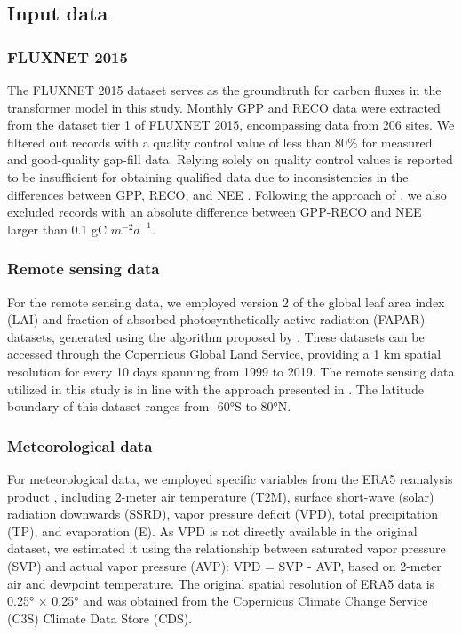 \subsection{Input data}

\subsubsection*{FLUXNET 2015}
The FLUXNET 2015 dataset \citep{pastorello2020fluxnet2015} serves as the groundtruth for carbon fluxes in the transformer model in this study. Monthly GPP and RECO data were extracted from the dataset tier 1 of FLUXNET 2015, encompassing data from 206 sites. We filtered out records with a quality control value of less than 80\% for measured and good-quality gap-fill data. Relying solely on quality control values is reported to be insufficient for obtaining qualified data due to inconsistencies in the differences between GPP, RECO, and NEE \citep{zeng2020global, tramontana2016predicting}. Following the approach of \citep{zeng2020global}, we also excluded records with an absolute difference between GPP-RECO and NEE larger than 0.1 gC $m^{-2} d^{-1}$.
\subsubsection*{Remote sensing data}
For the remote sensing data, we employed version 2 of the global leaf area index (LAI) and fraction of absorbed photosynthetically active radiation (FAPAR) datasets, generated using the algorithm proposed by \citep{verger2014near}. These datasets can be accessed through the Copernicus Global Land Service, providing a 1 km spatial resolution for every 10 days spanning from 1999 to 2019. The remote sensing data utilized in this study is in line with the approach presented in \citep{zeng2020global}. The latitude boundary of this dataset ranges from -60°S to 80°N. \par
\subsubsection*{Meteorological data}
For meteorological data, we employed specific variables from the ERA5 reanalysis product \citep{hersbach2020era5}, including 2-meter air temperature (T2M), surface short-wave (solar) radiation downwards (SSRD), vapor pressure deficit (VPD), total precipitation (TP), and evaporation (E). As VPD is not directly available in the original dataset, we estimated it using the relationship between saturated vapor pressure (SVP) and actual vapor pressure (AVP): VPD = SVP - AVP, based on 2-meter air and dewpoint temperature. The original spatial resolution of ERA5 data is 0.25° × 0.25° and was obtained from the Copernicus Climate Change Service (C3S) Climate Data Store (CDS). \par

